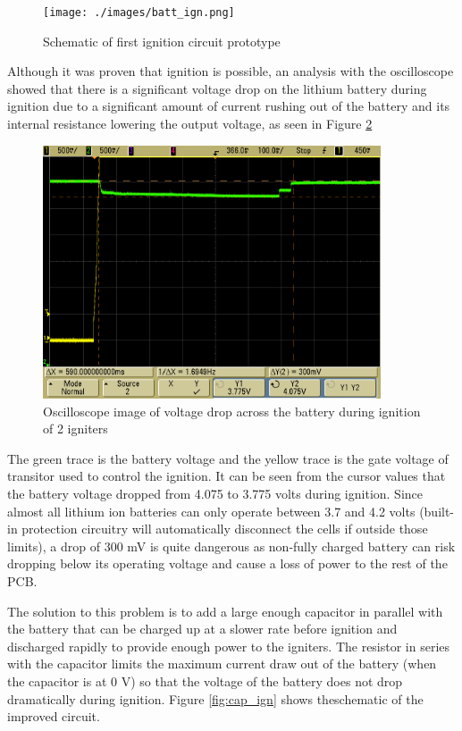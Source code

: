 \documentclass{workreport}
\begin{document}
\begin{body}
	\begin{figure}[!ht]
		\centering
		\texttt{[image: ./images/batt\_ign.png]}
		\caption{Schematic of first ignition circuit prototype}
		\label{fig:batt_ign}
	\end{figure}

	Although it was proven that ignition is possible, an analysis with the oscilloscope showed that there is a significant voltage drop on the lithium battery during ignition due to a significant amount of current rushing out of the battery and its internal resistance lowering the output voltage, as seen in Figure \ref{fig:via_battery}

	\begin{figure}[!ht]
		\centering
		\includegraphics[width=10cm]{./images/via_battery.png}
		\caption{Oscilloscope image of voltage drop across the battery during ignition of 2 igniters}
		\label{fig:via_battery}
	\end{figure}

	The green trace is the battery voltage and the yellow trace is the gate voltage of transitor used to control the ignition. It can be seen from the cursor values that the battery voltage dropped from 4.075 to 3.775 volts during ignition. Since almost all lithium ion batteries can only operate between 3.7 and 4.2 volts (built-in protection circuitry will automatically disconnect the cells if outside those limits), a drop of 300 mV is quite dangerous as non-fully charged battery can risk dropping below its operating voltage and cause a loss of power to the rest of the PCB.

	The solution to this problem is to add a large enough capacitor in parallel with the battery that can be charged up at a slower rate before ignition and discharged rapidly to provide enough power to the igniters. The resistor in series with the capacitor limits the maximum current draw out of the battery (when the capacitor is at 0 V) so that the voltage of the battery does not drop dramatically during ignition. Figure \ref{fig:cap_ign} shows theschematic of the  improved circuit.


\end{body}
\end{document}
